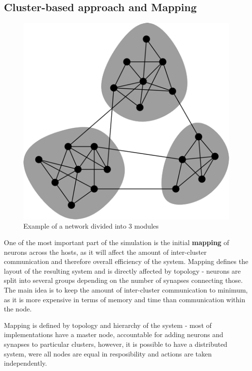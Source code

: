 \subsection{Cluster-based approach and Mapping}

\begin{figure}[h]
\begin{center}
\includegraphics[scale = 0.3]{images/modular_division.png}
\end{center}
\caption{Example of a network divided into 3 modules\cite{Newman2006}}
\end{figure}

One of the most important part of the simulation is the initial \textbf{mapping} of neurons across the hosts, as it will affect the amount of inter-cluster communication and therefore overall efficiency of the system. Mapping defines the layout of the resulting system and is directly affected by topology - neurons are split into several groups depending on the number of synapses connecting those. The main idea is to keep the amount of inter-cluster communication to minimum, as it is more expensive in terms of memory and time than communication within the node.

Mapping is defined by topology and hierarchy of the system - most of implementations have a master node, accountable for adding neurons and synapses to particular clusters, however, it is
possible to have a distributed system, were all nodes are equal in resposibility and actions are taken independently.

